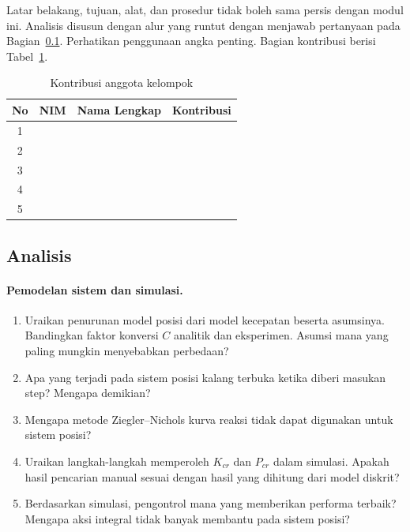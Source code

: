 \documentclass[11pt,a4paper]{article}
\begin{document}
Latar belakang, tujuan, alat, dan prosedur tidak boleh sama persis dengan modul ini. Analisis disusun dengan alur yang runtut dengan menjawab pertanyaan pada Bagian~\ref{sec:analisis}. Perhatikan penggunaan angka penting. Bagian kontribusi berisi Tabel~\ref{tab:kontribusi}.

\begin{table}[H]
\centering
\caption{Kontribusi anggota kelompok}
\label{tab:kontribusi}
\begin{tabularx}{\textwidth}{|c|c|l|X|}
\hline
\textbf{No} & \textbf{NIM} & \textbf{Nama Lengkap} & \textbf{Kontribusi} \\
\hline
1 & & & \\
2 & & & \\
3 & & & \\
4 & & & \\
5 & & & \\
\hline
\end{tabularx}
\end{table}

\subsection{Analisis}
\label{sec:analisis}

\paragraph{Pemodelan sistem dan simulasi.}
\begin{enumerate}
\item Uraikan penurunan model posisi dari model kecepatan beserta asumsinya. Bandingkan faktor konversi $C$ analitik dan eksperimen. Asumsi mana yang paling mungkin menyebabkan perbedaan?
\item Apa yang terjadi pada sistem posisi kalang terbuka ketika diberi masukan step? Mengapa demikian?
\item Mengapa metode Ziegler--Nichols kurva reaksi tidak dapat digunakan untuk sistem posisi?
\item Uraikan langkah-langkah memperoleh $K_{cr}$ dan $P_{cr}$ dalam simulasi. Apakah hasil pencarian manual sesuai dengan hasil yang dihitung dari model diskrit?
\item Berdasarkan simulasi, pengontrol mana yang memberikan performa terbaik? Mengapa aksi integral tidak banyak membantu pada sistem posisi?
\end{enumerate}
\end{document}
